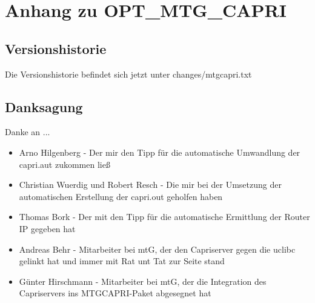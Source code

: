 \section {Anhang zu OPT\_MTG\_CAPRI}
\subsection{Versionshistorie}
    Die Versionshistorie befindet sich jetzt unter changes/mtgcapri.txt
\subsection{Danksagung}
    Danke  an ...
    \begin{itemize}
        \item Arno Hilgenberg - Der mir den Tipp für die automatische Umwandlung der capri.aut zukommen ließ
        \item Christian Wuerdig und Robert Resch - Die mir bei der Umsetzung der automatischen Erstellung der capri.out geholfen haben
        \item Thomas Bork - Der mit den Tipp für die automatische Ermittlung der Router IP gegeben hat
        \item Andreas Behr - Mitarbeiter bei mtG, der den Capriserver gegen die uclibc gelinkt hat und immer mit Rat unt Tat zur Seite stand
        \item Günter Hirschmann - Mitarbeiter bei mtG, der die Integration des Capriservers ins MTGCAPRI-Paket abgesegnet hat
    \end{itemize}

